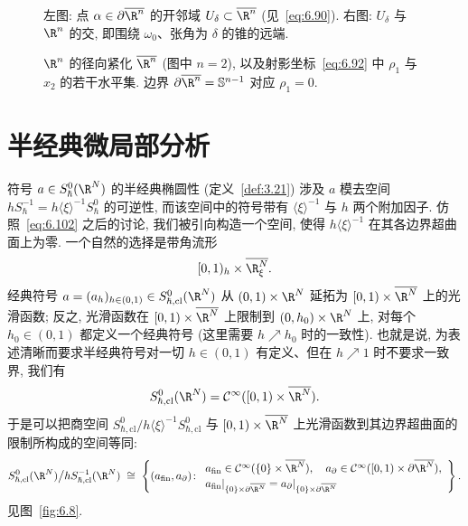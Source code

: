 \begin{figure}[htbp]
\centering
\drawFigSixSix
\caption{左图: 点 $\alpha \in \partial\overline{\R^n}$ 的开邻域 $U_\delta \subset \overline{\R^n}$ (见~\eqref{eq:6.90}). 右图: $U_\delta$ 与 $\R^n$ 的交, 即围绕 $\omega_0$、张角为 $\delta$ 的锥的远端.}
\label{fig:6.6}
\end{figure}

\begin{figure}[htbp]
\centering
\drawFigSixSeven
\caption{$\R^n$ 的径向紧化 $\overline{\R^n}$ (图中 $n = 2$), 以及射影坐标~\eqref{eq:6.92} 中 $\rho_1$ 与 $\hat{x}_2$ 的若干水平集. 边界 $\partial\overline{\R^n} = \mathbb{S}^{n-1}$ 对应 $\rho_1 = 0$.}
\label{fig:6.7}
\end{figure}



\section{半经典微局部分析}\label{sec:6.6}
%
%

符号 $a \in S^0_{\hbar}(\R^N)$ 的半经典椭圆性 (定义~\ref{def:3.21}) 涉及 $a$ 模去空间 $h S^{-1}_{\hbar} = h\langle \xi \rangle^{-1}S^0_{\hbar}$ 的可逆性, 而该空间中的符号带有 $\langle \xi \rangle^{-1}$ 与 $h$ 两个附加因子. 仿照~\eqref{eq:6.102} 之后的讨论, 我们被引向构造一个空间, 使得 $h\langle \xi \rangle^{-1}$ 在其各边界超曲面上为零. 一个自然的选择是带角流形
\begin{equation}\label{eq:6.103}
    [0, 1)_h \times \overline{\R^N_\xi}.
\end{equation}
经典符号 $a = (a_h)_{h \in (0,1)} \in S^0_{\hbar, \mathrm{cl}}(\R^N)$ 从 $(0,1) \times \R^N$ 延拓为 $[0,1) \times \overline{\R^N}$ 上的光滑函数; 反之, 光滑函数在 $[0,1) \times \overline{\R^N}$ 上限制到 $(0,h_0) \times \R^N$ 上, 对每个 $h_0 \in (0,1)$ 都定义一个经典符号 (这里需要 $h \nearrow h_0$ 时的一致性). 也就是说, 为表述清晰而要求半经典符号对一切 $h \in (0,1)$ 有定义、但在 $h \nearrow 1$ 时不要求一致界, 我们有
\begin{equation}\label{eq:6.104}
    S^0_{\hbar, \mathrm{cl}}(\R^N) = \Smooth([0,1) \times \overline{\R^N}).
\end{equation}
于是可以把商空间 $S^0_{\hbar, \mathrm{cl}}/h\langle \xi \rangle^{-1}S^0_{\hbar, \mathrm{cl}}$ 与 $[0,1) \times \overline{\R^N}$ 上光滑函数到其边界超曲面的限制所构成的空间等同:
\begin{equation}\label{eq:6.105}
    S^0_{\hbar, \mathrm{cl}}(\R^N) \big/ h S^{-1}_{\hbar, \mathrm{cl}}(\R^N) \;\cong\; \left\{ (a_{\mathrm{fin}}, a_\partial) \colon
    \begin{array}{l}
        a_{\mathrm{fin}} \in \Smooth(\{0\} \times \overline{\R^N}), \quad a_\partial \in \Smooth([0,1) \times \partial\overline{\R^N}), \\[2pt]
        a_{\mathrm{fin}}|_{\{0\} \times \partial\overline{\R^N}} = a_\partial|_{\{0\} \times \partial\overline{\R^N}}
    \end{array} \right\}.
\end{equation}
见图~\ref{fig:6.8}.

